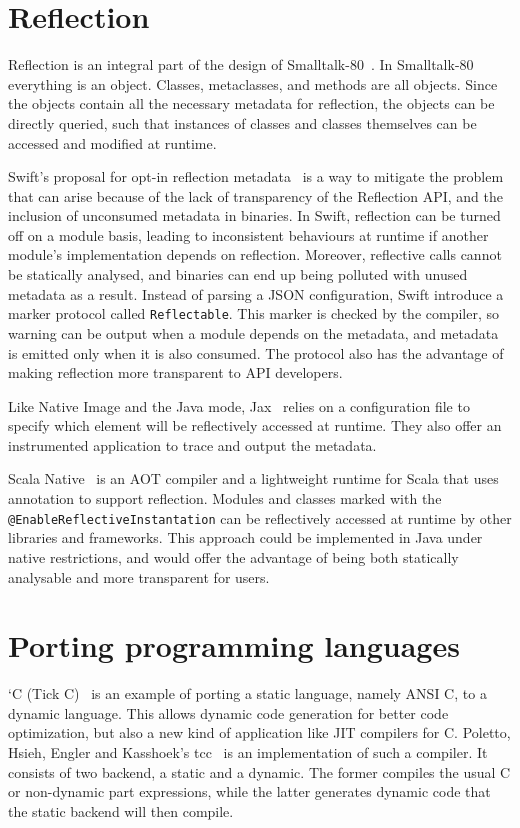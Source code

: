 \section{Reflection}
Reflection is an integral part of the design of Smalltalk-80~\cite{goldberg_smalltalk-80_1983}. In Smalltalk-80 everything is an object. Classes, metaclasses, and methods are all objects. Since the objects contain all the necessary metadata for reflection, the objects can be directly queried, such that instances of classes and classes themselves can be accessed and modified at runtime. 

Swift's proposal for opt-in reflection metadata~\cite{noauthor_pitch_2022} is a way to mitigate the problem that can arise because of the lack of transparency of the Reflection API, and the inclusion of unconsumed metadata in binaries. In Swift, reflection can be turned off on a module basis, leading to inconsistent behaviours at runtime if another module's implementation depends on reflection. Moreover, reflective calls cannot be statically analysed, and binaries can end up being polluted with unused metadata as a result. Instead of parsing a JSON configuration, Swift introduce a marker protocol called \verb|Reflectable|. This marker is checked by the compiler, so warning can be output when a module depends on the metadata, and metadata is emitted only when it is also consumed. The protocol also has the advantage of making reflection more transparent to API developers.

Like Native Image and the Java mode, Jax~\cite{tip_practical_1999} relies on a configuration file to specify which element will be reflectively accessed at runtime. They also offer an instrumented application to trace and output the metadata.

Scala Native~\cite{noauthor_scala_nodate} is an AOT compiler and a lightweight runtime for Scala that uses annotation to support reflection. Modules and classes marked with the \verb|@EnableReflectiveInstantation| can be reflectively accessed at runtime by other libraries and frameworks. 
This approach could be implemented in Java under native restrictions, and would offer the advantage of being both statically analysable and more transparent for users.

\section{Porting programming languages}
`C (Tick C)~\cite{engler_c_1996} is an example of porting a static language, namely ANSI C, to a dynamic language. This allows dynamic code generation for better code optimization, but also a new kind of application like JIT compilers for C. Poletto, Hsieh, Engler and Kasshoek's tcc~\cite{poletto_c_1999} is an implementation of such a compiler. It consists of two backend, a static and a dynamic.
The former compiles the usual C or non-dynamic part expressions, while the latter generates dynamic code that the static backend will then compile.

